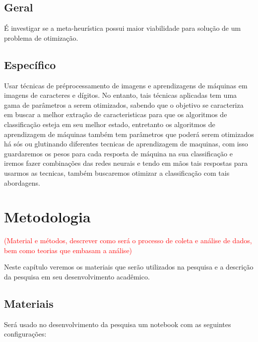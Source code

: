 \documentclass[12pt,a4paper,oneside]{book}
\newcommand\wb[1]{\discretionary{#1}{#1}{#1}}
\begin{document}
{\section{Geral}
\'{E} investigar se a meta-heur\'{i}stica possui maior viabilidade para
solu\c{c}\~{a}o de um problema de otimiza\c{c}\~{a}o.
\section{Espec\'{i}fico}
Usar t\'{e}cnicas de pr\'{e}\wb-processamento de imagens e aprendizagens de
m\'{a}quinas em imagens de caracteres e d\'{i}gitos. No entanto, tais
t\'{e}cnicas aplicadas tem uma gama de par\^{a}metros a serem otimizados,
sabendo que o objetivo se caracteriza em buscar a melhor extra\c{c}\~{a}o de
caracteristicas para que os algoritmos de classifica\c{c}\~{a}o esteja em seu
melhor estado, entretanto os algoritmos de aprendizagem de m\'{a}quinas
tamb\'{e}m tem par\^{a}metros que poder\'{a} serem otimizados h\'{a} s\'{o}s ou
glutinando diferentes tecnicas de aprendizagem de maquinas, com isso guardaremos
os pesos para cada resposta de m\'{a}quina na sua classifica\c{c}\~{a}o e iremos
fazer combina\c{c}\~{o}es das redes neurais e tendo em m\~{a}os tais respostas
para usarmos as tecnicas, tamb\'{e}m buscaremos otimizar a classifica\c{c}\~{a}o
com tais abordagens.
\pagebreak
\chapter{Metodologia}
\textcolor{red}{(Material e m\'{e}todos, descrever como ser\'{a} o processo de
coleta e an\'{a}lise de dados, bem como teorias que embasam a an\'{a}lise)}

Neste cap\'{i}tulo veremos os materiais que ser\~{a}o utilizados na pesquisa e a
descri\c{c}\~{a}o da pesquisa em seu desenvolvimento acad\^{e}mico.
\section{Materiais}
\noindent
Ser\'{a} usado no desenvolvimento da pesquisa um notebook com as seguintes configura\c{c}\~{o}es:

}
\end{document}
